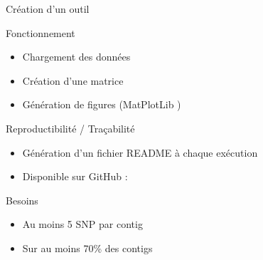 \begin{frame}{Création d'un outil}
    \begin{block}{Fonctionnement}
        \begin{itemize}
            \item Chargement des données
            \item Création d'une matrice
            \item Génération de figures (MatPlotLib \cite{matplotlib})
        \end{itemize}
    \end{block}

    \begin{block}{Reproductibilité / Traçabilité}
        \begin{itemize}
            \item Génération d'un fichier README à chaque exécution
            \item Disponible sur GitHub : \cite{florent_f-marchalm1bioinfointernship2024-inrae_agap_ge2pop_2024}
        \end{itemize}
    \end{block}

    \begin{alertblock}{Besoins}
        \begin{itemize}
            \small
            \item Au moins 5 SNP par contig
            \item Sur au moins 70\% des contigs
        \end{itemize}
    \end{alertblock}


    
\end{frame}
